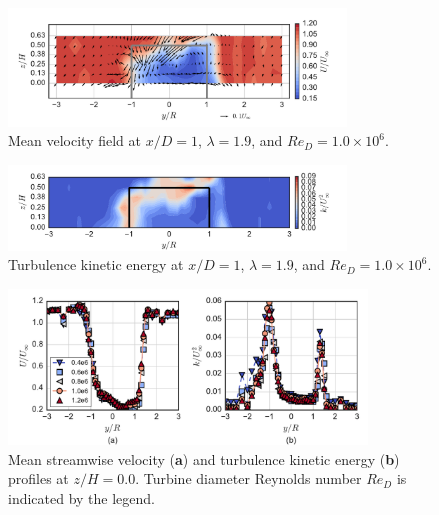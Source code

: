 \documentclass[energies,article,accept,moreauthors,pdftex,10pt,a4paper]{mdpi}
\theoremstyle{mdpi}
\newcounter{ex}
\newcounter{re}
\begin{document}
\begin{figure}[H]
 \centering
 
 \includegraphics[width=0.8\textwidth]{figures/meancontquiv_10}
 
 \caption{Mean velocity field at $x/D=1$, $\lambda=1.9$, and $Re_D=1.0 \times
 10^6$.}
 
 \label{fig:meancontquiv}
\end{figure}
\unskip

\begin{figure}[H]
 \centering
 
 \includegraphics[width=0.8\textwidth]{figures/k_contours_10}
 
 \caption{Turbulence kinetic energy at $x/D=1$, $\lambda=1.9$, and $Re_D=1.0
 \times 10^6$.}
 
 \label{fig:kcont}
\end{figure}
\unskip

\begin{figure}[H]
    \centering
 
    \includegraphics[width=0.85\textwidth]{figures/mean_u_k_profiles}
 
     \caption{Mean streamwise velocity (\textbf{a}) and turbulence kinetic
         energy (\textbf{b}) profiles at $z/H=0.0$. Turbine diameter Reynolds number
         $Re_D$ is indicated by the legend.}

    \label{fig:profiles}
\end{figure}
\end{document}
